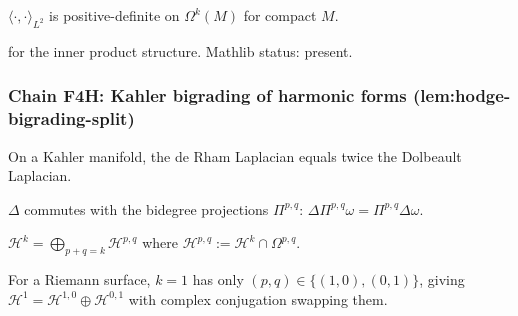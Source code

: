 \begin{lemma}
\label{lem:huh-r4}
$\langle\cdot,\cdot\rangle_{L^{2}}$ is positive-definite on $\Omega^{k}(M)$ for compact $M$.
\leanok\mathlibok
\end{lemma}

\begin{lemma}
\label{lem:huh-r5}
 for the inner product structure.  Mathlib status: present.
\leanok\mathlibok
\end{lemma}

\subsubsection*{Chain F4H: Kahler bigrading of harmonic forms (lem:hodge-bigrading-split)}

\begin{lemma}[Pass F4H.1: Kahler identity $\Delta_{d} = 2\Delta_{\bar\partial}$]
\label{lem:hbs-r1}
On a Kahler manifold, the de Rham Laplacian equals twice the Dolbeault Laplacian.
\leanok
\end{lemma}

\begin{lemma}
\label{lem:hbs-r2}
$\Delta$ commutes with the bidegree projections $\Pi^{p,q}$: $\Delta\Pi^{p,q}\omega = \Pi^{p,q}\Delta\omega$.
\leanok
\end{lemma}

\begin{lemma}
\label{lem:hbs-r3}
$\mathcal{H}^{k} = \bigoplus_{p+q=k}\mathcal{H}^{p,q}$ where $\mathcal{H}^{p,q} := \mathcal{H}^{k}\cap\Omega^{p,q}$.
\leanok
\end{lemma}

\begin{lemma}
\label{lem:hbs-r4}
For a Riemann surface, $k=1$ has only $(p,q) \in \{(1,0),(0,1)\}$, giving $\mathcal{H}^{1} = \mathcal{H}^{1,0}\oplus\mathcal{H}^{0,1}$ with complex conjugation swapping them.
\leanok
\end{lemma}

